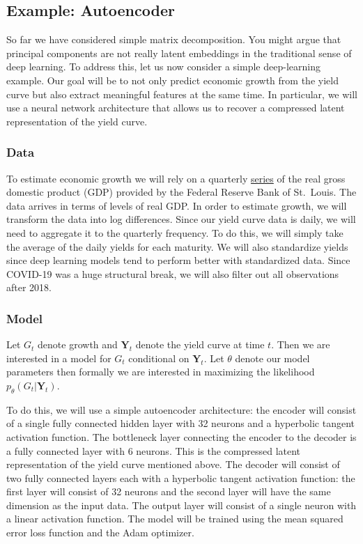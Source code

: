 \documentclass{article}
\theoremstyle{plain}
\theoremstyle{definition}
\theoremstyle{remark}
\begin{document}
\subsection{Example: Autoencoder}\label{example-deep-learning}

So far we have considered simple matrix decomposition. You might argue
that principal components are not really latent embeddings in the
traditional sense of deep learning. To address this, let us now consider
a simple deep-learning example. Our goal will be to not only predict
economic growth from the yield curve but also extract meaningful
features at the same time. In particular, we will use a neural network
architecture that allows us to recover a compressed latent
representation of the yield curve.

\subsubsection{Data}\label{data}

To estimate economic growth we will rely on a quarterly
\href{https://fred.stlouisfed.org/series/GDPC1}{series} of the real
gross domestic product (GDP) provided by the Federal Reserve Bank of
St.~Louis. The data arrives in terms of levels of real GDP. In order to
estimate growth, we will transform the data into log differences. Since
our yield curve data is daily, we will need to aggregate it to the
quarterly frequency. To do this, we will simply take the average of the
daily yields for each maturity. We will also standardize yields since
deep learning models tend to perform better with standardized data.
Since COVID-19 was a huge structural break, we will also filter out all
observations after 2018.

\subsubsection{Model}\label{model}

Let \(G_t\) denote growth and \(\mathbf{Y}_t\) denote the yield curve at
time \(t\). Then we are interested in a model for \(G_t\) conditional on
\(\mathbf{Y}_t\). Let \(\theta\) denote our model parameters then
formally we are interested in maximizing the likelihood
\(p_{\theta}(G_t|\mathbf{Y}_t)\). 

To do this, we will use a simple
autoencoder architecture: the encoder will consist of a single fully
connected hidden layer with 32 neurons and a hyperbolic tangent
activation function. The bottleneck layer connecting the encoder to the
decoder is a fully connected layer with 6 neurons. This is the
compressed latent representation of the yield curve mentioned above. The
decoder will consist of two fully connected layers each with a
hyperbolic tangent activation function: the first layer will consist of
32 neurons and the second layer will have the same dimension as the
input data. The output layer will consist of a single neuron with a
linear activation function. The model will be trained using the mean
squared error loss function and the Adam optimizer.
\end{document}
